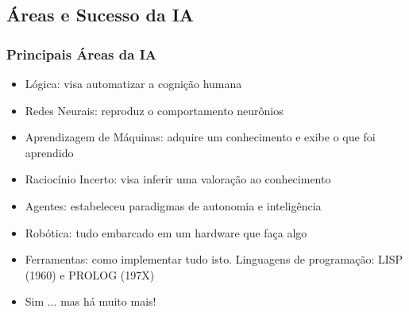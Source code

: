 \documentclass{beamer}
\begin{document}
\subsection{Áreas e Sucesso da IA}
\begin{frame}[fragile]
\frametitle{Principais Áreas da IA}
\begin{block}{}

  \begin{itemize}
   \item Lógica: visa automatizar a cognição humana

    \item Redes Neurais: reproduz o comportamento neurônios

    \item Aprendizagem de Máquinas: adquire um conhecimento e exibe o que foi aprendido

    \item Raciocínio Incerto: visa inferir uma valoração ao conhecimento

    \item Agentes: estabeleceu paradigmas de autonomia e inteligência
    
     \item Robótica: tudo embarcado em um hardware que faça algo
   
       \item Ferramentas: como implementar tudo isto. Linguagens de programação: LISP (1960) e PROLOG (197X)
       
     \item Sim ... mas há muito mais!
    \end{itemize}
  
\end{block}

\end{frame}

\end{document}
